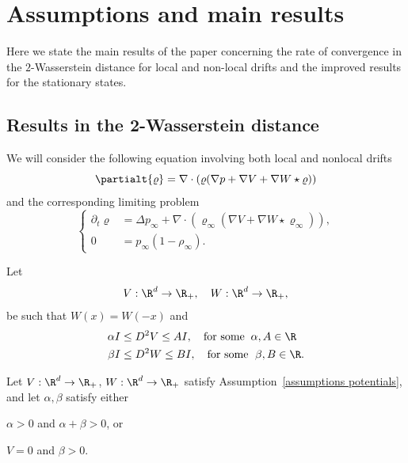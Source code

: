 \section{Assumptions and main results}

Here we state the main results of the paper concerning the rate of convergence in the $2$-Wasserstein distance for local and non-local drifts and the improved results for the stationary states.

\subsection{Results in the 2-Wasserstein distance}

We will consider the following equation involving both local and nonlocal drifts
\begin{equation}\label{main tot}
\partialt{\varrho} = \nabla\cdot(\varrho (\nabla p+ \nabla V + \nabla W \star \varrho))
\end{equation}
and the corresponding limiting problem
\begin{equation}\label{main:limit}
\left\{
\begin{aligned}
\partial_{t}\varrho &= \Delta p_{\infty} + \nabla\cdot(\varrho_{\infty} ( \nabla V + \nabla W \star \varrho_{\infty})),\\[5pt]
0&=p_{\infty}(1-\rho_{\infty}).
\end{aligned}
\right.
\end{equation}

\begin{assumption}\label{assumptions potentials}
Let
\[
V:\R^d\to\R_+,\quad W:\R^d\to\R_+,
\]
be such that $W(x)=W(-x)$ and
\begin{align*}%
\alpha I &\leq D^2 V \leq A I, \quad \text{for some } \: \alpha, A \in \R\\
\beta I &\leq D^2 W \leq B I, \quad \text{for some } \; \beta, B \in \R.
\end{align*}
\end{assumption}
\begin{assumption}\label{assum: global}
Let $V:\R^d\to\R_+$, $W:\R^d\to\R_+$ satisfy Assumption~\ref{assumptions potentials}, and let $\alpha, \beta$ satisfy either
\begin{enumeratei}
\item\label{assum: globali}
$\alpha >0$ and $\alpha + \beta >0$, or
\item\label{assum: globalii}
$V=0$ and $\beta>0$.
\end{enumeratei}
\end{assumption}

